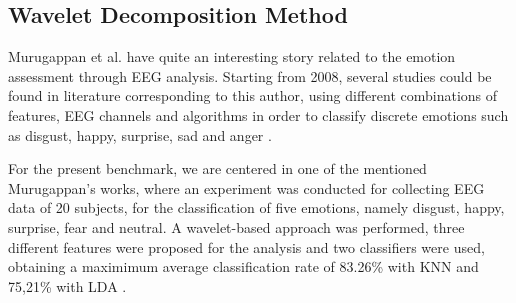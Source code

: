 \documentclass{sig-alternate}
\begin{document}




\subsection{Wavelet Decomposition Method}	

Murugappan et al. have quite an interesting story related to the emotion assessment through EEG analysis. Starting from 2008, several studies could be found in literature corresponding to this author, using different combinations of features, EEG channels and algorithms in order to classify discrete emotions such as disgust, happy, surprise, sad and anger \cite{murugappan2008time,murugappan2009wavelet}.

For the present benchmark, we are centered in one of the mentioned Murugappan's works, where an experiment was conducted for collecting EEG data of 20 subjects, for the classification of five emotions, namely disgust, happy, surprise, fear and neutral. A wavelet-based approach was performed, three different features were proposed for the analysis and two classifiers were used, obtaining a maximimum average classification rate of 83.26\% with KNN and 75,21\% with LDA \cite{murugappan2010classification}.
\end{document}
